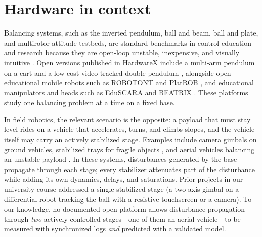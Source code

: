 \section{Hardware in context}
\label{sec:context}

Balancing systems, such as the inverted pendulum, ball and beam, ball and plate, and multirotor attitude testbeds, are standard benchmarks in control education and research because they are open-loop unstable, inexpensive, and visually intuitive \cite{astrom2008,hauser1992,awtar2002}. Open versions published in HardwareX include a multi-arm pendulum on a cart \cite{kaheman2023} and a low-cost video-tracked double pendulum \cite{myers2020}, alongside open educational mobile robots such as ROBOTONT \cite{raudmae2023} and PlatROB \cite{balbuena2026}, and educational manipulators and heads such as EduSCARA \cite{clark2026} and BEATRIX \cite{al2024}. These platforms study one balancing problem at a time on a fixed base.

In field robotics, the relevant scenario is the opposite: a payload that must stay level rides on a vehicle that accelerates, turns, and climbs slopes, and the vehicle itself may carry an actively stabilized stage. Examples include camera gimbals on ground vehicles, stabilized trays for fragile objects \cite{selvaggio2023}, and aerial vehicles balancing an unstable payload \cite{hehn2011}. In these systems, disturbances generated by the base propagate through each stage; every stabilizer attenuates part of the disturbance while adding its own dynamics, delays, and saturations. Prior projects in our university course addressed a single stabilized stage (a two-axis gimbal on a differential robot tracking the ball with a resistive touchscreen or a camera). To our knowledge, no documented open platform allows disturbance propagation through \emph{two} actively controlled stages---one of them an aerial vehicle---to be measured with synchronized logs \emph{and} predicted with a validated model.

